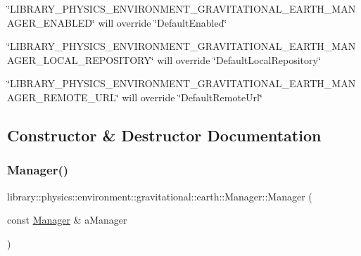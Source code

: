 \begin{DoxyItemize}
\item \char`\"{}\+L\+I\+B\+R\+A\+R\+Y\+\_\+\+P\+H\+Y\+S\+I\+C\+S\+\_\+\+E\+N\+V\+I\+R\+O\+N\+M\+E\+N\+T\+\_\+\+G\+R\+A\+V\+I\+T\+A\+T\+I\+O\+N\+A\+L\+\_\+\+E\+A\+R\+T\+H\+\_\+\+M\+A\+N\+A\+G\+E\+R\+\_\+\+E\+N\+A\+B\+L\+E\+D\char`\"{} will override \char`\"{}\+Default\+Enabled\char`\"{}
\item \char`\"{}\+L\+I\+B\+R\+A\+R\+Y\+\_\+\+P\+H\+Y\+S\+I\+C\+S\+\_\+\+E\+N\+V\+I\+R\+O\+N\+M\+E\+N\+T\+\_\+\+G\+R\+A\+V\+I\+T\+A\+T\+I\+O\+N\+A\+L\+\_\+\+E\+A\+R\+T\+H\+\_\+\+M\+A\+N\+A\+G\+E\+R\+\_\+\+L\+O\+C\+A\+L\+\_\+\+R\+E\+P\+O\+S\+I\+T\+O\+R\+Y\char`\"{} will override \char`\"{}\+Default\+Local\+Repository\char`\"{}
\item \char`\"{}\+L\+I\+B\+R\+A\+R\+Y\+\_\+\+P\+H\+Y\+S\+I\+C\+S\+\_\+\+E\+N\+V\+I\+R\+O\+N\+M\+E\+N\+T\+\_\+\+G\+R\+A\+V\+I\+T\+A\+T\+I\+O\+N\+A\+L\+\_\+\+E\+A\+R\+T\+H\+\_\+\+M\+A\+N\+A\+G\+E\+R\+\_\+\+R\+E\+M\+O\+T\+E\+\_\+\+U\+R\+L\char`\"{} will override \char`\"{}\+Default\+Remote\+Url\char`\"{} 
\end{DoxyItemize}

\subsection{Constructor \& Destructor Documentation}
\mbox{\label{classlibrary_1_1physics_1_1environment_1_1gravitational_1_1earth_1_1_manager_a15862a738d0bcafd7c0d827e568c74eb}} 
\subsubsection{\texorpdfstring{Manager()}{Manager()}}
{\footnotesize\ttfamily library\+::physics\+::environment\+::gravitational\+::earth\+::\+Manager\+::\+Manager (\begin{DoxyParamCaption}\item[{const \hyperlink{classlibrary_1_1physics_1_1environment_1_1gravitational_1_1earth_1_1_manager}{Manager} \&}]{a\+Manager }\end{DoxyParamCaption})\hspace{0.3cm}{\ttfamily [delete]}}



